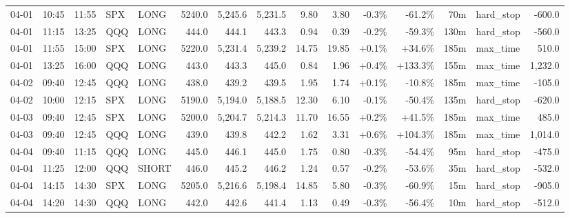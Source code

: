 \documentclass[11pt,a4paper,twoside]{article}
\begin{document}
\begin{landscape}
\begin{center}
\begin{longtable}{>{\color{txtmain}}l l l l l r r r r r r r r >{\color{txtmain}}l r}
04-01 & 10:45 & 11:55 & SPX & LONG & 5240.0 & 5,245.6 & 5,231.5 & 9.80 & 3.80 & \textcolor{lossred}{-0.3\%} & \textcolor{lossred}{-61.2\%} & 70m & hard\_stop & \textcolor{lossred}{-600.0} \\
04-01 & 11:15 & 13:25 & QQQ & LONG & 444.0 & 444.1 & 443.3 & 0.94 & 0.39 & \textcolor{lossred}{-0.2\%} & \textcolor{lossred}{-59.3\%} & 130m & hard\_stop & \textcolor{lossred}{-560.0} \\
04-01 & 11:55 & 15:00 & SPX & LONG & 5220.0 & 5,231.4 & 5,239.2 & 14.75 & 19.85 & \textcolor{wingreen}{+0.1\%} & \textcolor{wingreen}{+34.6\%} & 185m & max\_time & \textcolor{wingreen}{510.0} \\
04-01 & 13:25 & 16:00 & QQQ & LONG & 443.0 & 443.3 & 445.0 & 0.84 & 1.96 & \textcolor{wingreen}{+0.4\%} & \textcolor{wingreen}{+133.3\%} & 155m & max\_time & \textcolor{wingreen}{1,232.0} \\
04-02 & 09:40 & 12:45 & QQQ & LONG & 438.0 & 439.2 & 439.5 & 1.95 & 1.74 & \textcolor{wingreen}{+0.1\%} & \textcolor{lossred}{-10.8\%} & 185m & max\_time & \textcolor{lossred}{-105.0} \\
04-02 & 10:00 & 12:15 & SPX & LONG & 5190.0 & 5,194.0 & 5,188.5 & 12.30 & 6.10 & \textcolor{lossred}{-0.1\%} & \textcolor{lossred}{-50.4\%} & 135m & hard\_stop & \textcolor{lossred}{-620.0} \\
04-03 & 09:40 & 12:45 & SPX & LONG & 5200.0 & 5,204.7 & 5,214.3 & 11.70 & 16.55 & \textcolor{wingreen}{+0.2\%} & \textcolor{wingreen}{+41.5\%} & 185m & max\_time & \textcolor{wingreen}{485.0} \\
04-03 & 09:40 & 12:45 & QQQ & LONG & 439.0 & 439.8 & 442.2 & 1.62 & 3.31 & \textcolor{wingreen}{+0.6\%} & \textcolor{wingreen}{+104.3\%} & 185m & max\_time & \textcolor{wingreen}{1,014.0} \\
04-04 & 09:40 & 11:15 & QQQ & LONG & 445.0 & 446.1 & 445.0 & 1.75 & 0.80 & \textcolor{lossred}{-0.3\%} & \textcolor{lossred}{-54.4\%} & 95m & hard\_stop & \textcolor{lossred}{-475.0} \\
04-04 & 11:25 & 12:00 & QQQ & SHORT & 446.0 & 445.2 & 446.2 & 1.24 & 0.57 & \textcolor{lossred}{-0.2\%} & \textcolor{lossred}{-53.6\%} & 35m & hard\_stop & \textcolor{lossred}{-532.0} \\
04-04 & 14:15 & 14:30 & SPX & LONG & 5205.0 & 5,216.6 & 5,198.4 & 14.85 & 5.80 & \textcolor{lossred}{-0.3\%} & \textcolor{lossred}{-60.9\%} & 15m & hard\_stop & \textcolor{lossred}{-905.0} \\
04-04 & 14:20 & 14:30 & QQQ & LONG & 442.0 & 442.6 & 441.4 & 1.13 & 0.49 & \textcolor{lossred}{-0.3\%} & \textcolor{lossred}{-56.4\%} & 10m & hard\_stop & \textcolor{lossred}{-512.0} \\

\end{longtable}
\end{center}
\end{landscape}
\end{document}
